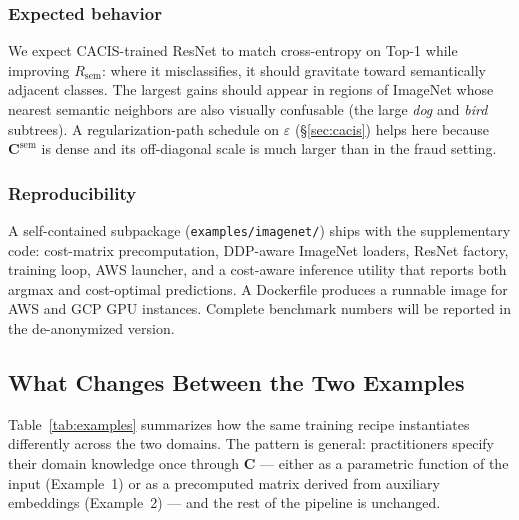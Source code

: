\documentclass[sigconf,anonymous]{acmart}
\newcommand{\CACIS}{\textsc{CACIS}}
\newcommand{\mC}{\mathbf{C}}
\begin{document}
\subsubsection{Expected behavior}
We expect \CACIS{}-trained ResNet to match cross-entropy on Top-1 while improving $R_{\mathrm{sem}}$: where it misclassifies, it should gravitate toward semantically adjacent classes. The largest gains should appear in regions of ImageNet whose nearest semantic neighbors are also visually confusable (the large \emph{dog} and \emph{bird} subtrees). A regularization-path schedule on $\varepsilon$ (\S\ref{sec:cacis}) helps here because $\mC^{\mathrm{sem}}$ is dense and its off-diagonal scale is much larger than in the fraud setting.

\subsubsection{Reproducibility}
A self-contained subpackage (\texttt{examples/imagenet/}) ships with the supplementary code: cost-matrix precomputation, DDP-aware ImageNet loaders, ResNet factory, training loop, AWS launcher, and a cost-aware inference utility that reports both argmax and cost-optimal predictions. A Dockerfile produces a runnable image for AWS and GCP GPU instances. Complete benchmark numbers will be reported in the de-anonymized version.

\subsection*{What Changes Between the Two Examples}
Table~\ref{tab:examples} summarizes how the same training recipe instantiates differently across the two domains. The pattern is general: practitioners specify their domain knowledge once through $\mC$ --- either as a parametric function of the input (Example~1) or as a precomputed matrix derived from auxiliary embeddings (Example~2) --- and the rest of the pipeline is unchanged.
\end{document}
